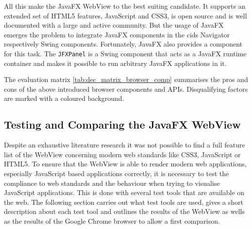 All this make the JavaFX WebView to the best suiting candidate. It supports an extended set of HTML5 features, JavaScript and CSS3, is open source and is well documented with a large and active community.
But the usage of JavaFX emerges the problem to integrate JavaFX components in the cids Navigator respectively Swing components.
Fortunately, JavaFX also provides a component for this task.
The \texttt{JFXPanel} is a Swing component that acts as a JavaFX runtime container and makes it possible to run arbitrary JavaFX applications in it.
 
The evaluation matrix \ref{tab:dec_matrix_browser_comp} summarises the pros and cons of the above introduced browser components and APIs. Disqualifying factors are marked with a coloured background.



\subsection{Testing and Comparing the JavaFX WebView}\label{chap:browser_api_testing}

Despite an exhaustive literature research it was not possible to find a full feature list of the WebView concerning modern web standards like CSS3, JavaScript or HTML5.
To ensure that the WebView is able to render modern web applications, especially JavaScript based applications correctly, it is necessary to test the compliance to web standards and the behaviour when trying to visualise JavaScript applications.
This is done with several test tools that are available on the web.
The following section carries out what test tools are used, gives a short description about each test tool and outlines the results of the WebView as wells as the results of the Google Chrome browser to allow a first comparison.

